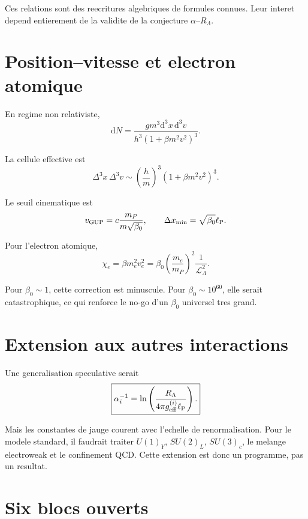 \documentclass[11pt,a4paper]{article}
\newcommand{\lp}{\ell_{\rm P}}
\newcommand{\RL}{R_\Lambda}
\newcommand{\calL}{\mathcal L}
\newcommand{\dif}{\mathrm d}
\begin{document}
Ces relations sont des reecritures algebriques de formules connues. Leur
interet depend entierement de la validite de la conjecture \(\alpha\)--\(R_\Lambda\).

\section{Position--vitesse et electron atomique}

En regime non relativiste,
\begin{equation}
\dif N=\frac{g m^3\dif^3x\,\dif^3v}{h^3(1+\beta m^2v^2)^3}.
\end{equation}

La cellule effective est
\begin{equation}
\boxed{
\Delta^3x\,\Delta^3v\sim
\left(\frac{h}{m}\right)^3(1+\beta m^2v^2)^3.
}
\end{equation}

Le seuil cinematique est
\begin{equation}
v_{\rm GUP}=c\frac{m_P}{m\sqrt{\beta_0}},
\qquad
\Delta x_{\min}=\sqrt{\beta_0}\lp.
\end{equation}

Pour l'electron atomique,
\begin{equation}
\chi_e=\beta m_e^2v_e^2
=\beta_0\left(\frac{m_e}{m_P}\right)^2\frac{1}{\calL_\Lambda^2}.
\end{equation}

Pour \(\beta_0\sim1\), cette correction est minuscule. Pour
\(\beta_0\sim10^{60}\), elle serait catastrophique, ce qui renforce le no-go
d'un \(\beta_0\) universel tres grand.

\section{Extension aux autres interactions}

Une generalisation speculative serait
\begin{equation}
\boxed{
\alpha_i^{-1}=\ln\left(\frac{\RL}{4\pi g_{\rm eff}^{(i)}\lp}\right).
}
\end{equation}

Mais les constantes de jauge courent avec l'echelle de renormalisation. Pour
le modele standard, il faudrait traiter \(U(1)_Y\), \(SU(2)_L\), \(SU(3)_c\),
le melange electroweak et le confinement QCD. Cette extension est donc un
programme, pas un resultat.

\section{Six blocs ouverts}
\end{document}
